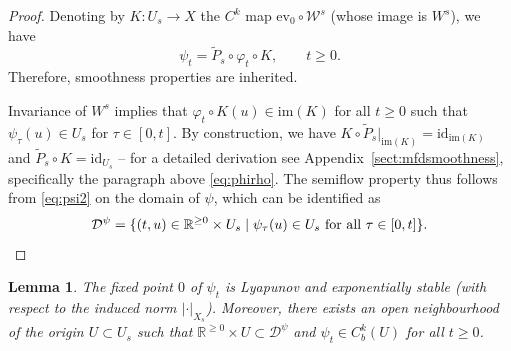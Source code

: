 \documentclass[a4paper, 12pt, oneside, reqno, notitlepage]{amsart}
\theoremstyle{plain}
\newtheorem{lemma}[theorem]{Lemma}
\theoremstyle{definition}
\theoremstyle{remark}
\newcommand{\im}{\mathrm{im}}
\begin{document}
\begin{proof}
    Denoting by $K: U_s \to X$ the $C^k$ map $\mathrm{ev}_0 \circ \mathcal{W}^s$ (whose image is $W^s$),
    we have 
    \begin{equation}
        \psi_t = \widetilde{P}_s \circ \varphi_t \circ K, \qquad t \geq 0.
        \label{eq:psi2}
    \end{equation}
    Therefore, smoothness properties are inherited.
    
    Invariance of $W^s$ implies that $\varphi_t \circ K(u) \in \im(K)$ for all $t\geq 0$ such that $\psi_\tau(u) \in U_s$ for $\tau \in [0,t]$.
    By construction, we have $K \circ \widetilde{P}_s|_{\im(K)} = \mathrm{id}_{\im(K)}$ and $\widetilde{P}_s \circ K = \mathrm{id}_{U_s}$ -- for a detailed derivation see Appendix~\ref{sect:mfdsmoothness}, specifically the paragraph above \eqref{eq:phirho}.
    The semiflow property thus follows from \eqref{eq:psi2} on the domain of $\psi$, which can be identified as 
    \begin{equation}
        \mathcal{D}^\psi = \{ (t,u) \in \mathbb{R}^{\geq 0} \times U_s \; | \; \psi_\tau (u) \in U_s \text{ for all } \tau \in [0,t] \}. \qedhere
        \label{eq:mathcalDpsi}
    \end{equation}
\end{proof}

\begin{lemma} \label{lemma:LyapstabCkb}
    The fixed point $0$ of $\psi_t$ is Lyapunov and exponentially stable (with respect to the induced norm $| \cdot |_{X_s}$).
    Moreover, there exists an open neighbourhood of the origin $U \subset U_s$ such that $\mathbb{R}^{\geq 0} \times U \subset \mathcal{D}^\psi$ and $\psi_t \in C^k_b(U)$ for all $t \geq 0$.
\end{lemma}
\end{document}
